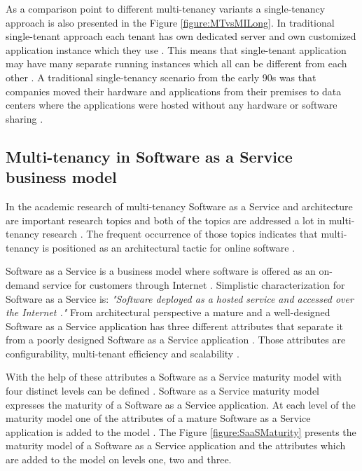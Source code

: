 \documentclass[conference]{sasmoota2017}
\begin{document}
As a comparison point to different multi-tenancy variants a single-tenancy approach is also presented in the Figure \ref{figure:MTvsMILong}. In traditional single-tenant approach each tenant has own dedicated server and own customized application instance which they use \cite{Bezemer:2010:MaintenanceDream}. This means that single-tenant application may have many separate running instances which all can be different from each other \cite{Bezemer:2010:MaintenanceDream}. A traditional single-tenancy scenario from the early 90s was that companies moved their hardware and applications from their premises to data centers where the applications were hosted without any hardware or software sharing \cite{Guo:2007:FrameworkForNative}. 

\subsection{Multi-tenancy in Software as a Service business model}

In the academic research of multi-tenancy Software as a Service and architecture are important research topics and both of the topics are addressed a lot in multi-tenancy research \cite{Kabbedijk2015:Defining}. The frequent occurrence of those topics indicates that multi-tenancy is positioned as an architectural tactic for online software \cite{Kabbedijk2015:Defining}. 

Software as a Service is a business model where software is offered as an on-demand service for customers through Internet \cite{Bezemer:2010:MaintenanceDream}. Simplistic characterization for Software as a Service is: \textit{"Software deployed as a hosted service and accessed over the Internet \cite{Carraro:2006:ArchitectureLongTail}."} From architectural perspective a mature and a well-designed Software as a Service application has three different attributes that separate it from a poorly designed Software as a Service application \cite{Carraro:2006:ArchitectureLongTail}. Those attributes are configurability, multi-tenant efficiency and scalability \cite{Carraro:2006:ArchitectureLongTail}.

With the help of these attributes a Software as a Service maturity model with four distinct levels can be defined \cite{Carraro:2006:ArchitectureLongTail}. Software as a Service maturity model expresses the maturity of a Software as a Service application. At each level of the maturity model one of the attributes of a mature Software as a Service application is added to the model \cite{Carraro:2006:ArchitectureLongTail}. The Figure \ref{figure:SaaSMaturity} presents the maturity model of a Software as a Service application and the attributes which are added to the model on levels one, two and three. 
\end{document}
